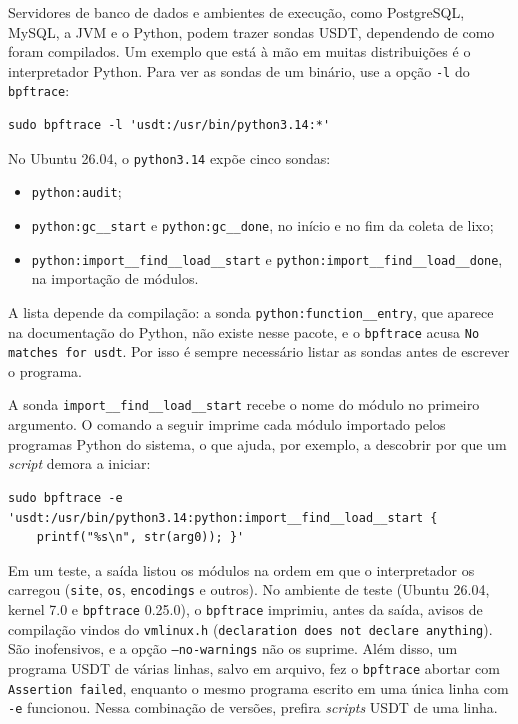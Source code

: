 Servidores de banco de dados e ambientes de execução, como PostgreSQL, MySQL, a JVM e o Python, podem trazer sondas USDT, dependendo de como foram compilados. Um exemplo que está à mão em muitas distribuições é o interpretador Python. Para ver as sondas de um binário, use a opção \texttt{-l} do \texttt{bpftrace}:

\begin{lstlisting}
sudo bpftrace -l 'usdt:/usr/bin/python3.14:*'
\end{lstlisting}

No Ubuntu 26.04, o \texttt{python3.14} expõe cinco sondas:

\begin{itemize}
  \item \texttt{python:audit};
  \item \texttt{python:gc\_\_start} e \texttt{python:gc\_\_done}, no início e no fim da coleta de lixo;
  \item \texttt{python:import\_\_find\_\_load\_\_start} e \texttt{python:import\_\_find\_\_load\_\_done}, na importação de módulos.
\end{itemize}

A lista depende da compilação: a sonda \texttt{python:function\_\_entry}, que aparece na documentação do Python, não existe nesse pacote, e o \texttt{bpftrace} acusa \texttt{No matches for usdt}. Por isso é sempre necessário listar as sondas antes de escrever o programa.

A sonda \texttt{import\_\_find\_\_load\_\_start} recebe o nome do módulo no primeiro argumento. O comando a seguir imprime cada módulo importado pelos programas Python do sistema, o que ajuda, por exemplo, a descobrir por que um \textit{script} demora a iniciar:

\begin{lstlisting}
sudo bpftrace -e 'usdt:/usr/bin/python3.14:python:import__find__load__start {
    printf("%s\n", str(arg0)); }'
\end{lstlisting}

Em um teste, a saída listou os módulos na ordem em que o interpretador os carregou (\texttt{site}, \texttt{os}, \texttt{encodings} e outros). No ambiente de teste (Ubuntu 26.04, kernel 7.0 e \texttt{bpftrace} 0.25.0), o \texttt{bpftrace} imprimiu, antes da saída, avisos de compilação vindos do \texttt{vmlinux.h} (\texttt{declaration does not declare anything}). São inofensivos, e a opção \texttt{--no-warnings} não os suprime. Além disso, um programa USDT de várias linhas, salvo em arquivo, fez o \texttt{bpftrace} abortar com \texttt{Assertion failed}, enquanto o mesmo programa escrito em uma única linha com \texttt{-e} funcionou. Nessa combinação de versões, prefira \textit{scripts} USDT de uma linha.

